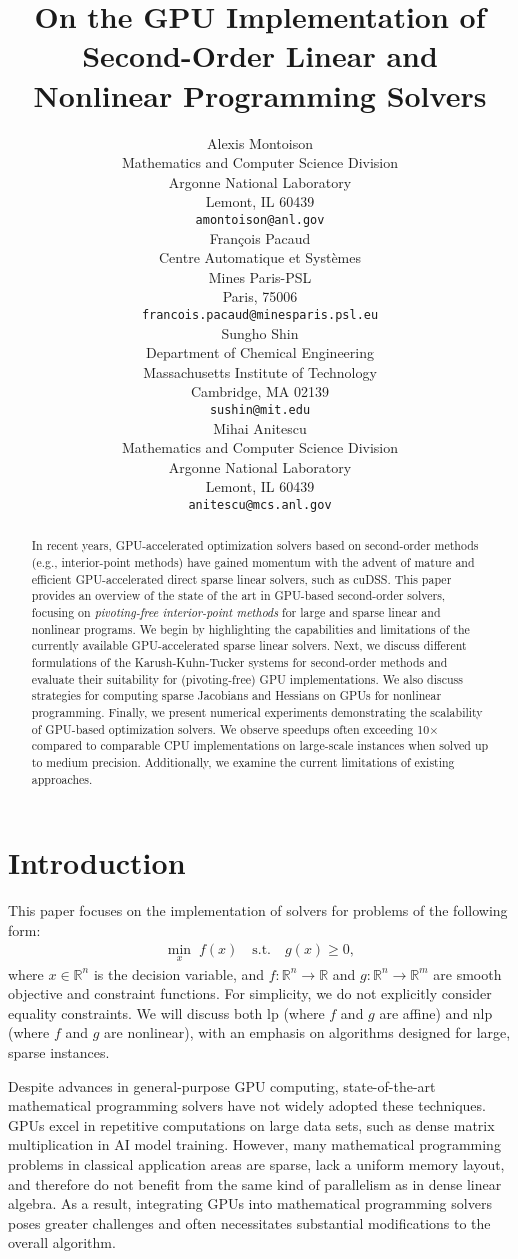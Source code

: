 \documentclass{article}
\title{On the GPU Implementation of Second-Order Linear and Nonlinear Programming Solvers}
\author{%
  Alexis Montoison\\
  Mathematics and Computer Science Division\\
  Argonne National Laboratory\\
  Lemont, IL 60439\\
  \texttt{amontoison@anl.gov}\\
  \And
  Fran\c{c}ois Pacaud\\
  Centre Automatique et Systèmes\\
  Mines Paris-PSL\\
  Paris, 75006 \\
  \texttt{francois.pacaud@minesparis.psl.eu}\\
  \And
  Sungho Shin\\
  Department of Chemical Engineering\\
  Massachusetts Institute of Technology\\
  Cambridge, MA 02139\\
  \texttt{sushin@mit.edu}\\
  \And
  Mihai Anitescu\\
  Mathematics and Computer Science Division\\
  Argonne National Laboratory\\
  Lemont, IL 60439\\
  \texttt{anitescu@mcs.anl.gov}\\
}
\begin{document}
\maketitle


\begin{abstract}
In recent years, GPU-accelerated optimization solvers based on second-order methods (e.g., interior-point methods) have gained momentum with the advent of mature and efficient GPU-accelerated direct sparse linear solvers, such as cuDSS.
This paper provides an overview of the state of the art in GPU-based second-order solvers, focusing on \emph{pivoting-free interior-point methods} for large and sparse linear and nonlinear programs.
We begin by highlighting the capabilities and limitations of the currently available GPU-accelerated sparse linear solvers.
Next, we discuss different formulations of the Karush-Kuhn-Tucker systems for second-order methods and evaluate their suitability for (pivoting-free) GPU implementations.
We also discuss strategies for computing sparse Jacobians and Hessians on GPUs for nonlinear programming.
Finally, we present numerical experiments demonstrating the scalability of GPU-based optimization solvers.
We observe speedups often exceeding 10× compared to comparable CPU implementations on large-scale instances when solved up to medium precision.
Additionally, we examine the current limitations of existing approaches.

\end{abstract}

\section{Introduction}\label{eqn:intro}

This paper focuses on the implementation of solvers for problems of the following form:
\begin{align}\label{eqn:opt}
  \min_{x } \; f(x) \quad \text{s.t.} \quad g(x) \geq 0,
\end{align}
where \(x \in \mathbb{R}^n\) is the decision variable, and \(f: \mathbb{R}^n \to \mathbb{R}\) and \(g: \mathbb{R}^n \to \mathbb{R}^m\) are smooth objective and constraint functions. 
For simplicity, we do not explicitly consider equality constraints. 
We will discuss both \gls*{lp} (where \(f\) and \(g\) are affine) and \gls*{nlp} (where \(f\) and \(g\) are nonlinear), with an emphasis on algorithms designed for large, sparse instances.

Despite advances in general-purpose GPU computing, state-of-the-art mathematical programming solvers have not widely adopted these techniques. GPUs excel in repetitive computations on large data sets, such as dense matrix multiplication in AI model training. However, many mathematical programming problems in classical application areas are sparse, lack a uniform memory layout, and therefore do not benefit from the same kind of parallelism as in dense linear algebra. As a result, integrating GPUs into mathematical programming solvers poses greater challenges and often necessitates substantial modifications to the overall algorithm.
\end{document}
